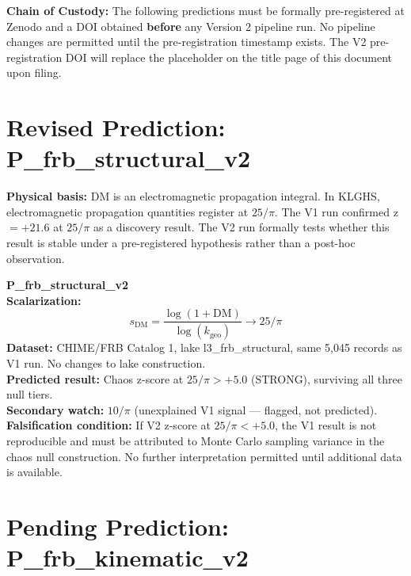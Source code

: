 \documentclass[11pt, letterpaper, openany]{book}
\begin{document}
\begin{warningbox}
\textbf{Chain of Custody:} The following predictions must be formally
pre-registered at Zenodo and a DOI obtained \textbf{before} any Version 2
pipeline run. No pipeline changes are permitted until the pre-registration
timestamp exists. The V2 pre-registration DOI will replace the placeholder
on the title page of this document upon filing.
\end{warningbox}

\section*{Revised Prediction: P\_frb\_structural\_v2}

\textbf{Physical basis:} DM is an electromagnetic propagation integral.
In KLGHS, electromagnetic propagation quantities register at $25/\pi$.
The V1 run confirmed z $= +21.6$ at $25/\pi$ as a discovery result.
The V2 run formally tests whether this result is stable under a
pre-registered hypothesis rather than a post-hoc observation.

\begin{predictionbox}
\textbf{P\_frb\_structural\_v2}\\[0.5em]
\textbf{Scalarization:}
\begin{equation}
s_{\text{DM}} = \frac{\log(1 + \text{DM})}{\log(k_{\text{geo}})}
\longrightarrow 25/\pi
\end{equation}
\textbf{Dataset:} CHIME/FRB Catalog 1, lake l3\_frb\_structural,
same 5,045 records as V1 run. No changes to lake construction.\\[0.5em]
\textbf{Predicted result:} Chaos z-score at $25/\pi > +5.0$ (STRONG),
surviving all three null tiers.\\[0.5em]
\textbf{Secondary watch:} $10/\pi$ (unexplained V1 signal --- flagged,
not predicted).\\[0.5em]
\textbf{Falsification condition:} If V2 z-score at $25/\pi < +5.0$,
the V1 result is not reproducible and must be attributed to Monte Carlo
sampling variance in the chaos null construction. No further interpretation
permitted until additional data is available.
\end{predictionbox}

\section*{Pending Prediction: P\_frb\_kinematic\_v2}
\end{document}
